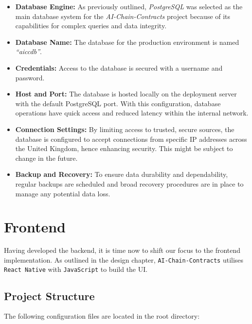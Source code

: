 \begin{itemize}
    \item \textbf{Database Engine:} As previously outlined, \textit{PostgreSQL} was selected as the main database system for the \textit{AI-Chain-Contracts} project because of its capabilities for complex queries and data integrity.
    \item \textbf{Database Name:} The database for the production environment is named \textit{``aiccdb''}.
    \item \textbf{Credentials:} Access to the database is secured with a username and password.
    \item \textbf{Host and Port:} The database is hosted locally on the deployment server with the default PostgreSQL port. With this configuration, database operations have quick access and reduced latency within the internal network.
    \item \textbf{Connection Settings:} By limiting access to trusted, secure sources, the database is configured to accept connections from specific IP addresses across the United Kingdom, hence enhancing security. This might be subject to change in the future.
    \item \textbf{Backup and Recovery:} To ensure data durability and dependability, regular backups are scheduled and broad recovery procedures are in place to manage any potential data loss.
\end{itemize}

\section{Frontend}

Having developed the backend, it is time now to shift our focus to the frontend implementation. As outlined in the design chapter, \texttt{AI-Chain-Contracts} utilises \texttt{React Native} with \texttt{JavaScript} to build the UI. 

\subsection{Project Structure}

The following configuration files are located in the root directory: 

